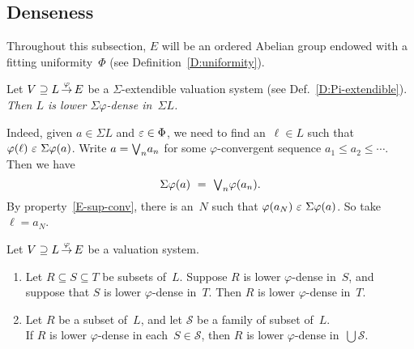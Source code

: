 \documentclass[main.tex]{subfiles}
\begin{document}
\subsection{Denseness}
\label{SS:dense}
Throughout this subsection,
$E$ will be an ordered Abelian group
endowed with a fitting uniformity~$\Phi$
(see Definition~\ref{D:uniformity}).
%
%
\begin{ex}
Let $V \supseteq L\,\smash{\stackrel{\varphi}{\rightarrow}}\,E$
be a $\Sigma$-extendible valuation system
(see Def.~\ref{D:Pi-extendible}).
\emph{Then $L$ is lower $\Sigma\varphi$-dense in~$\Sigma L$.}

Indeed,
given $a\in \Sigma L$
and $\varepsilon \in \Phi$,
we need to find an~$\ell\in L$ 
such that $\varphi(\ell) \ \ve\ \Sigma\varphi(a)$.
Write $a=\textstyle{\bigvee}_n a_n$ for
some $\varphi$-convergent sequence $a_1 \leq a_2 \leq \dotsb$.
Then we have
\begin{equation*}
\Sigma\varphi(a)\ =\ \textstyle{\bigvee}_n \varphi(a_n).
\end{equation*}
By property~\ref{E-sup-conv},
there is an~$N$ such that $\varphi(a_N) \ \ve\ \Sigma\varphi(a)$.
So take $\ell =a_N$.
\end{ex}
%
%
\begin{lem}
\label{L:ldense-prop}
Let $V \supseteq L\,\smash{\stackrel{\varphi}{\rightarrow}}\,E$ be a valuation system.
\begin{enumerate}
\item
\label{L:ldense-prop-1}
Let $R\subseteq S\subseteq T$ be subsets of~$L$.
Suppose $R$ is lower $\varphi$-dense in~$S$,
and suppose that $S$ is lower $\varphi$-dense in~$T$.
Then $R$ is lower $\varphi$-dense in~$T$.

\item
\label{L:ldense-prop-2}
Let $R$ be a subset of~$L$,
and let $\mathcal S$ be a family of subset of~$L$.\\
If $R$ is lower $\varphi$-dense in each~$S\in \mathcal{S}$,
then $R$ is lower $\varphi$-dense in~$\bigcup \mathcal{S}$.
\end{enumerate}
\end{lem}
\end{document}
